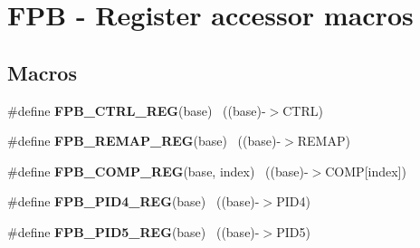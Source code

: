 \hypertarget{group___f_p_b___register___accessor___macros}{}\section{F\+P\+B -\/ Register accessor macros}
\label{group___f_p_b___register___accessor___macros}
\subsection*{Macros}
\begin{DoxyCompactItemize}
\item 
\hypertarget{group___f_p_b___register___accessor___macros_ga51c51db7f0fa370f16b973df21399a88}{}\#define {\bfseries F\+P\+B\+\_\+\+C\+T\+R\+L\+\_\+\+R\+E\+G}(base)                                          ~((base)-\/$>$C\+T\+R\+L)\label{group___f_p_b___register___accessor___macros_ga51c51db7f0fa370f16b973df21399a88}

\item 
\hypertarget{group___f_p_b___register___accessor___macros_gaa4d1a55b94416f3ef869793d4d461e5c}{}\#define {\bfseries F\+P\+B\+\_\+\+R\+E\+M\+A\+P\+\_\+\+R\+E\+G}(base)                                        ~((base)-\/$>$R\+E\+M\+A\+P)\label{group___f_p_b___register___accessor___macros_gaa4d1a55b94416f3ef869793d4d461e5c}

\item 
\hypertarget{group___f_p_b___register___accessor___macros_ga52fd8faa26cc52d39d15e4897e218bcb}{}\#define {\bfseries F\+P\+B\+\_\+\+C\+O\+M\+P\+\_\+\+R\+E\+G}(base,  index)                              ~((base)-\/$>$C\+O\+M\+P\mbox{[}index\mbox{]})\label{group___f_p_b___register___accessor___macros_ga52fd8faa26cc52d39d15e4897e218bcb}

\item 
\hypertarget{group___f_p_b___register___accessor___macros_gac4488406275c11c81ee5843d2686d198}{}\#define {\bfseries F\+P\+B\+\_\+\+P\+I\+D4\+\_\+\+R\+E\+G}(base)                                          ~((base)-\/$>$P\+I\+D4)\label{group___f_p_b___register___accessor___macros_gac4488406275c11c81ee5843d2686d198}

\item 
\hypertarget{group___f_p_b___register___accessor___macros_ga7272b28f89b58ec02dab267cd22e503e}{}\#define {\bfseries F\+P\+B\+\_\+\+P\+I\+D5\+\_\+\+R\+E\+G}(base)                                          ~((base)-\/$>$P\+I\+D5)\label{group___f_p_b___register___accessor___macros_ga7272b28f89b58ec02dab267cd22e503e}


\end{DoxyCompactItemize}
